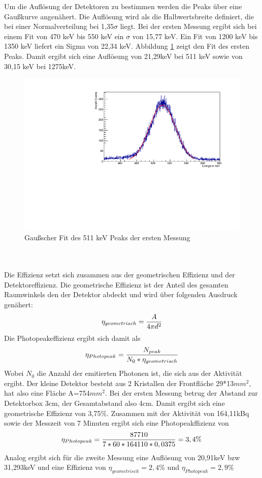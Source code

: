 \documentclass[a4paper,11pt,twoside]{article}
\begin{document}
Um die Auflösung der Detektoren zu bestimmen werden die Peaks über eine Gaußkurve angenähert. Die Auflösung wird als die Halbwertsbreite definiert, die bei einer Normalverteilung bei 1,35$\sigma$ liegt. Bei der ersten Messung ergibt sich bei einem Fit von 470 keV bis 550 keV ein $\sigma$ von 15,77 keV. Ein Fit von 1200 keV bis 1350 keV liefert ein Sigma von 22,34 keV. Abbildung \ref{l2} zeigt den Fit des ersten Peaks. Damit ergibt sich eine Auflösung von 21,29keV bei 511 keV sowie von 30,15 keV bei 1275keV.
\begin{figure}[htbp]
	\begin{center}
		\includegraphics[width=\textwidth]{Fit1.pdf}
		\caption{Gaußscher Fit des 511 keV Peaks der ersten Messung}
		\label{l2}
	\end{center}
\end{figure}
\\\\
Die Effizienz setzt sich zusammen aus der geometrischen Effizienz und der Detektoreffizienz. Die geometrische Effizienz ist der Anteil des gesamten Raumwinkels den der Detektor abdeckt und wird über folgenden Ausdruck genähert:
\begin{equation}
\eta_{geometrisch}={A\over 4 \pi d^2}
\end{equation}
Die Photopeakeffizienz ergibt sich damit als
\begin{equation}
\eta_{Photopeak}={N_{peak}\over N_0*\eta_{geometrisch}}
\end{equation}
Wobei $N_0$ die Anzahl der emitierten Photonen ist, die sich aus der Aktivität ergibt. Der kleine Detektor besteht aus 2 Kristallen der Frontfläche 29*13$mm^2$, hat also eine Fläche A=754$mm^2$. Bei der ersten Messung betrug der Abstand zur Detektorbox 3cm, der Gesamtabstand also 4cm. Damit ergibt sich eine geometrische Effizienz von 3,75\%. Zusammen mit der Aktivität von 164,11kBq sowie der Messzeit von 7 Minuten ergibt sich eine Photopeakffizienz von
\begin{equation}
\eta_{Photopeak}={87710\over 7*60*164110*0,0375}=3,4\%
\end{equation}
Analog ergibt sich für die zweite Messung eine Auflösung von 20,91keV bzw 31,293keV und eine Effizienz von $\eta_{geometrisch}=2,4\%$ und $\eta_{Photopeak}=2,9\%$
%
%
%
%
%
\end{document}
